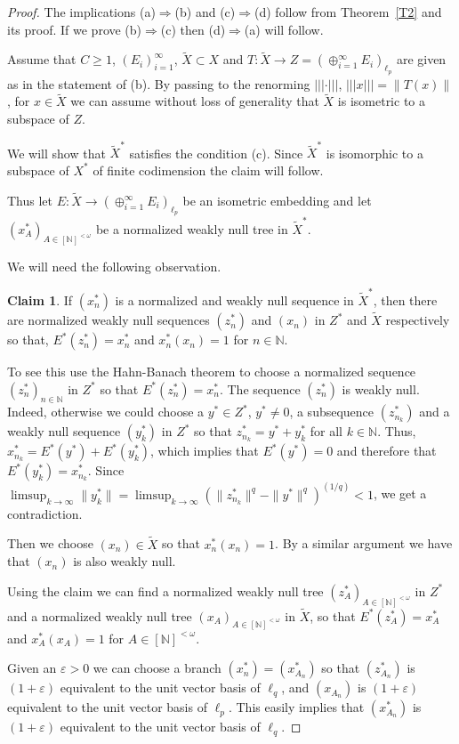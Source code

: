 \documentclass[11pt,leqno]{amsart}
\theoremstyle{definition}
\newtheorem*{claim}{Claim}
\newcommand{\vp}{\varepsilon}
\newcommand{\tX}{\tilde X}
\newcommand{\N}{\mathbb{N}}
\newcommand{\fN}{[\N]^{<\omega}}
\begin{document}
\begin{proof}
The implications  (a)$\Rightarrow$(b) and (c)$\Rightarrow$(d) follow
from Theorem~\ref{T2} and its proof. 
If we prove 
(b)$\Rightarrow$(c) then (d)$\Rightarrow$(a) will follow. 
    
Assume that $C\ge 1$, $(E_i)_{i=1}^\infty$, $\tX\subset X$ and
$T:\tX\to Z=(\oplus_{i=1}^\infty  E_i)_{\ell_p}$ are given as in the statement
of (b). By passing to the renorming $|||\cdot|||$,
$|||x|||=\|T(x)\|$, for $x\in\tX$ we can assume without
loss of generality that $\tX$ is isometric to a subspace of $Z$. 
    
We will show that $\tX^*$ satisfies the condition (c). Since 
$\tX^*$ is isomorphic to a subspace of $X^*$ of finite codimension
the claim will follow.
    
Thus let $E:\tX\to (\oplus_{i=1}^\infty E_i)_{\ell_p}$  be an isometric
embedding and let 
$(x^*_A)_{A\in\fN}$ be a normalized weakly null tree in $\tilde X^*$.
    
We will need the following observation.
    
\begin{claim} 
If $(x_n^*)$ is a normalized and weakly null sequence in $\tX^*$,
then there are normalized weakly null sequences $(z^*_n)$ and $(x_n)$ in
$Z^*$ and  $\tX$ respectively so that,
$E^*(z^*_n)=x^*_n$ and $x^*_n(x_n)=1$ for $n\in\N$.
\end{claim}
    
To see this use the Hahn-Banach theorem to     
choose a  normalized sequence $(z^*_n)_{n\in\N}$ in $Z^*$ so that
$E^*(z_n^*)=x_n^*$. 
The sequence  $(z^*_n)$ is weakly null. 
Indeed, otherwise we could
choose a $y^*\in Z^*$, $y^*\not=0$, a subsequence $(z^*_{n_k})$ and
a  weakly null sequence $(y^*_k)$ in $Z^*$ so that
$z^*_{n_k}=y^*+y^*_k$ for all $k\in\N$. 
Thus, $x^*_{n_k}=E^*(y^*)+E^*(y^*_k)$, which implies that $E^*(y^*)=0$ and
therefore that $E^*(y^*_k)=x^*_{n_k}$.
Since $\limsup_{k\to\infty}\|y^*_k\|=
\limsup_{k\to\infty}(\|z^*_{n_k}\|^q-\|y^*\|^q)^{(1/q)}<1$, we get 
a contradiction.
      
Then we choose  $(x_n)\in \tX$ so that $x^*_n(x_n)=1$.  
By a similar argument we have that $(x_n)$ is also weakly null.
     
Using the claim we can find a normalized weakly null tree 
$(z^*_A)_{A\in\fN}$ in
$Z^*$ and a normalized weakly null tree $(x_A)_{A\in\fN}$ in $\tX$,
so that  $E^*(z^*_A)=x^*_A$ and $x^*_A(x_A)=1$ for $A\in\fN$.
      
Given an $\vp>0$ we can choose a branch $(x^*_n)=(x^*_{A_n})$ so that
$(z^*_{A_n})$ is $(1+\vp)$ equivalent  to the  unit vector basis of $\ell_q$,
and $(x_{A_n})$ is $(1+\vp)$ equivalent  to the unit vector basis of $\ell_p$.
This easily implies that $(x^*_{A_n})$ is $(1+\vp)$ equivalent to the
unit vector basis of $\ell_q$.     
\end{proof} 
\end{document}
